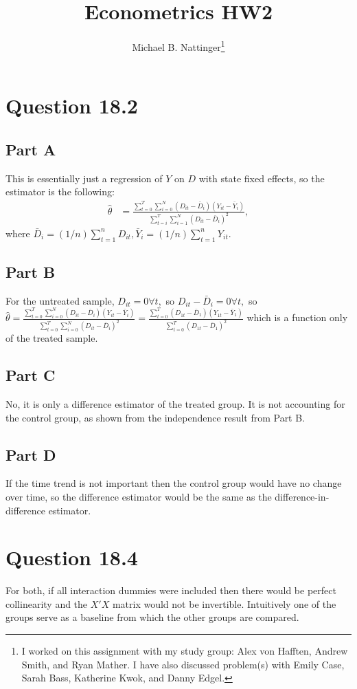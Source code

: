 \documentclass[11pt]{article} %
\title{Econometrics HW2}
\author{Michael B. Nattinger\footnote{I worked on this assignment with my study group: Alex von Hafften, Andrew Smith, and Ryan Mather. I have also discussed problem(s) with Emily Case, Sarah Bass, Katherine Kwok, and Danny Edgel.}}
\begin{document}
\maketitle

\section{Question 18.2}
\subsection{Part A}
This is essentially just a regression of $Y$ on $D$ with state fixed effects, so the estimator is the following:
\begin{align*}
\hat{\theta} &= \frac{\sum_{t=0}^{T}\sum_{i=0}^{N}(D_{it} - \bar{D}_{i})(Y_{it} - \bar{Y}_{i})}{\sum_{t=i}^{T}\sum_{i=1}^{N}(D_{it} - \bar{D}_{i})^2},
\end{align*}
where $\bar{D}_i = (1/n)\sum_{t=1}^n D_{it},\bar{Y}_i = (1/n)\sum_{t=1}^n Y_{it}$.
\subsection{Part B}
For the untreated sample, $D_{it} = 0 \forall t,$ so $D_{it} - \bar{D}_i = 0 \forall t,$ so $\hat{\theta} =  \frac{\sum_{t=0}^{T}\sum_{i=0}^{N}(D_{it} - \bar{D}_{i})(Y_{it} - \bar{Y}_{i})}{\sum_{t=0}^{T}\sum_{i=0}^{N}(D_{it} - \bar{D}_{i})^2} =  \frac{\sum_{t=0}^{T}(D_{1t} - \bar{D}_{1})(Y_{1t} - \bar{Y}_{1})}{\sum_{t=0}^{T}(D_{1t} - \bar{D}_{1})^2}$ which is a function only of the treated sample.
\subsection{Part C}
No, it is only a difference estimator of the treated group. It is not accounting for the control group, as shown from the independence result from Part B.
\subsection{Part D}
If the time trend is not important then the control group would have no change over time, so the difference estimator would be the same as the difference-in-difference estimator.
\section{Question 18.4}
For both, if all interaction dummies were included then there would be perfect collinearity and the $X'X$ matrix would not be invertible. Intuitively one of the groups serve as a baseline from which the other groups are compared.
\end{document}
